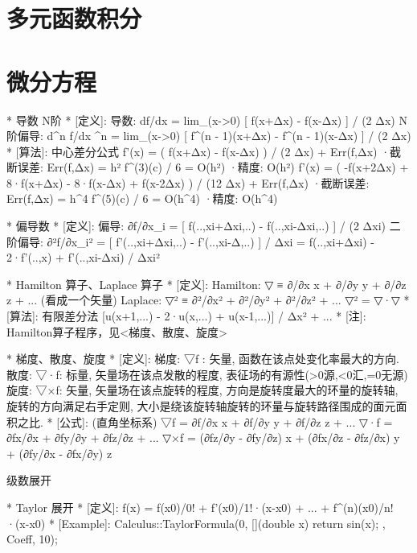     	\section{多元函数积分}
		
\section{微分方程}



    *                    导数  N阶
    *	[定义]:
            导数: df/dx = lim_(x->0)  [ f(x+Δx) - f(x-Δx) ] / (2 Δx)
            N阶偏导:
                  d^n f/dx ^n = lim_(x->0)  [ f^(n - 1)(x+Δx) - f^(n - 1)(x-Δx) ] / (2 Δx)
    *	[算法]: 中心差分公式
            f'(x) = ( f(x+Δx) -  f(x-Δx) ) / (2 Δx) + Err(f,Δx)
            ·截断误差: Err(f,Δx) = h² f^(3)(c) / 6 = O(h²)
            ·精度: O(h²)
            f'(x) = ( -f(x+2Δx) + 8·f(x+Δx) - 8·f(x-Δx) + f(x-2Δx) ) / (12 Δx) + Err(f,Δx)
            ·截断误差: Err(f,Δx) = h^4 f^(5)(c) / 6 = O(h^4)
            ·精度: O(h^4)


*                    偏导数
*	[定义]:
		偏导: ∂f/∂x_i = [ f(..,xi+Δxi,..) -  f(..,xi-Δxi,..) ] / (2 Δxi)
		二阶偏导:
			∂²f/∂x_i² = [ f'(..,xi+Δxi,..) -  f'(..,xi-Δ,..) ] / Δxi
					  = f(..,xi+Δxi) - 2·f'(..,x) + f'(..,xi-Δxi) / Δxi²



*                    Hamilton 算子、Laplace 算子
*	[定义]: 
		Hamilton: ▽  ≡ ∂/∂x \vec x + ∂/∂y \vec y + ∂/∂z \vec z + ... (看成一个矢量)
		Laplace:  ▽² ≡ ∂²/∂x² + ∂²/∂y² + ∂²/∂z² + ...
		▽² = ▽·▽
*	[算法]: 有限差分法
		[u(x+1,...) - 2·u(x,...) + u(x-1,...)] / Δx² + ...
*	[注]: Hamilton算子程序，见<梯度、散度、旋度>                      
       


*                    梯度、散度、旋度
*	[定义]:
		梯度: ▽f		: 矢量, 函数在该点处变化率最大的方向.
		散度: ▽·\vec f: 标量, 矢量场在该点发散的程度, 表征场的有源性(>0源,<0汇,=0无源)
		旋度: ▽×\vec f: 矢量, 矢量场在该点旋转的程度, 
							方向是旋转度最大的环量的旋转轴, 旋转的方向满足右手定则,
							大小是绕该旋转轴旋转的环量与旋转路径围成的面元面积之比.
*	[公式]: (直角坐标系)
		▽f        = ∂f/∂x \vec x + ∂f/∂y \vec y + ∂f/∂z \vec z + ...
		▽·\vec f =  ∂fx/∂x + ∂fy/∂y + ∂fz/∂z + ...
		▽×\vec f = (∂fz/∂y - ∂fy/∂z) \vec x
				   + (∂fx/∂z - ∂fz/∂x) \vec y
				   + (∂fy/∂x - ∂fx/∂y) \vec z


级数展开


*                    Taylor 展开
*	[定义]: 
		f(x) = f(x0)/0! + f'(x0)/1!·(x-x0) + ... + f^(n)(x0)/n!·(x-x0)
*	[Example]:
		Calculus::TaylorFormula(0, [](double x) { return sin(x); }, Coeff, 10);



